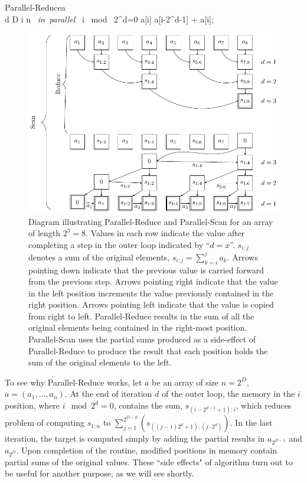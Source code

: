 {\begin{pseudocode}[ruled]{Parallel-Reduce}{a}
\label{reduce}
\\
\FOR d  \TO D \DO \BEGIN
  \FOR i  \TO n \mbox{ \em in parallel }\DO \BEGIN
    \IF i \mbox{ mod } 2^d=0 \DO \BEGIN
    a[i] \GETS a[i-2^{d-1}] + a[i];\\
    \END \END \END
\end{pseudocode}

\begin{figure}
\includegraphics[width=\textwidth]{diagram}
\caption{Diagram illustrating Parallel-Reduce and Parallel-Scan for an array of length $2^3=8$. Values in each row indicate the value after completing a step in the outer loop indicated by ``$d=x$''. $s_{i:j}$ denotes a sum of the original elements, $s_{i:j}=\sum_{k=i}^j a_k$. Arrows pointing down indicate that the previous value is carried forward from the previous step. Arrows pointing right indicate that the value in the left position increments the value previously contained in the right position. Arrows pointing left indicate that the value is copied from right to left. Parallel-Reduce results in the sum of all the original elements being contained in the right-most position. Parallel-Scan uses the partial sums produced as a side-effect of Parallel-Reduce to produce the result that each position holds the sum of the original elements to the left.}
\label{scan-illustration}
\end{figure}

To see why Parallel-Reduce works, let $a$ be an array of size $n=2^D$, $a=(a_1,\ldots,a_n)$. At the end of iteration $d$ of the outer loop, the memory in the $i$ position, where $i \mod 2^d =0$, contains the sum, $s_{(i-2^{d-1}+1):i}$, which reduces problem of computing $s_{1:n}$ to $\sum_{j=1}^{2^{D-d}}(s_{((j-1) 2^d+1):(j\cdot 2^d)})$. In the last iteration, the target is computed simply by adding the partial results in $a_{2^{D-1}}$ and $a_{2^{D}}$. Upon completion of the routine, modified positions in memory contain partial sums of the original values. These ``side effects" of algorithm turn out to be useful for another purpose, as we will see shortly. 

}
